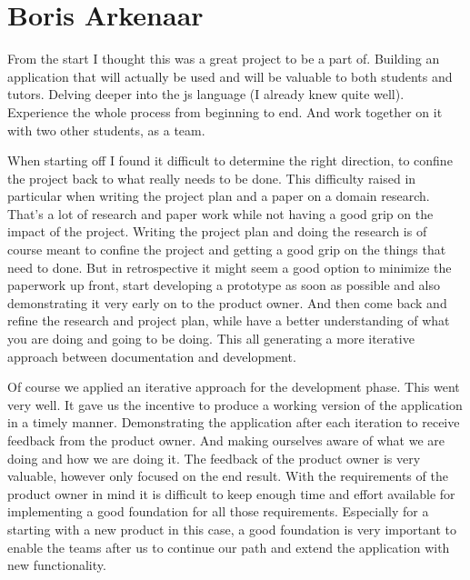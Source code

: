 
\section{Boris Arkenaar}
From the start I thought this was a great project to be a part of.
Building an application that will actually be used
and will be valuable to both \glspl{student} and \glspl{tutor}.
Delving deeper into the \gls{js} language (I already knew quite well).
Experience the whole process from beginning to end.
And work together on it with two other students, as a team.

When starting off I found it difficult to determine the right direction,
to confine the project back to what really needs to be done.
This difficulty raised in particular when writing the project plan
and a paper on a domain research.
That's a lot of research and paper work
while not having a good grip on the impact of the project.
Writing the project plan and doing the research
is of course meant to confine the project
and getting a good grip on the things that need to done.
But in retrospective it might seem a good option
to minimize the paperwork up front,
start developing a prototype as soon as possible and
also demonstrating it very early on to the product owner.
And then come back and refine the research and project plan,
while have a better understanding of what you are doing
and going to be doing.
This all generating a more iterative approach
between documentation and development.

Of course we applied an iterative approach for the development phase.
This went very well.
It gave us the incentive to produce a working version of the application
in a timely manner.
Demonstrating the application after each iteration
to receive feedback from the product owner.
And making ourselves aware of what we are doing
and how we are doing it.
The feedback of the product owner is very valuable,
however only focused on the end result.
With the requirements of the product owner in mind
it is difficult to keep enough time and effort available
for implementing a good foundation for all those requirements.
Especially for a starting with a new product in this case,
a good foundation is very important
to enable the teams after us to continue our path
and extend the application with new functionality.


